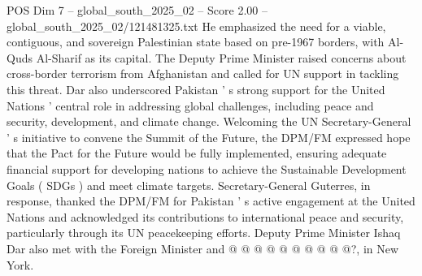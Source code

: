 \begin{textsample}{POS Dim 7 – global\_south\_2025\_02 – Score 2.00 – global\_south\_2025\_02/121481325.txt}
He emphasized the need for a viable, contiguous, and sovereign Palestinian state based on pre-1967 borders, with Al-Quds Al-Sharif as its capital.
The Deputy Prime Minister raised concerns about cross-border terrorism from Afghanistan and called for UN support in tackling this threat.
Dar also underscored Pakistan ' s strong support for the United Nations ' central role in addressing global challenges, including peace and security, development, and climate change.
Welcoming the UN Secretary-General ' s initiative to convene the Summit of the Future, the DPM/FM expressed hope that the Pact for the Future would be fully implemented, ensuring adequate financial support for developing nations to achieve the Sustainable Development Goals ( SDGs ) and meet climate targets.
Secretary-General Guterres, in response, thanked the DPM/FM for Pakistan ' s active engagement at the United Nations and acknowledged its contributions to international peace and security, particularly through its UN peacekeeping efforts.
Deputy Prime Minister Ishaq Dar also met with the Foreign Minister and @ @ @ @ @ @ @ @ @ @?, in New York.

\end{textsample}
